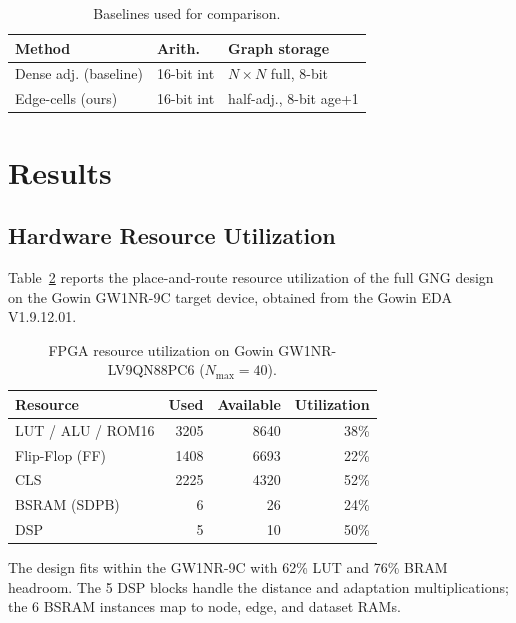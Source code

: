 \documentclass[conference]{IEEEtran}
\begin{document}
\begin{table}[!h]
\caption{Baselines used for comparison.}
\label{tab:baselines}
\centering
\footnotesize
\begin{tabular}{l l l}
\toprule
\textbf{Method} & \textbf{Arith.} & \textbf{Graph storage} \\
\midrule
Dense adj. (baseline) & 16-bit int & $N{\times}N$ full, 8-bit \\
Edge-cells (ours)     & 16-bit int & half-adj., 8-bit age+1 \\
\bottomrule
\end{tabular}
\end{table}


\section{Results}

\subsection{Hardware Resource Utilization}
Table~\ref{tab:synthesis} reports the place-and-route resource utilization of the full GNG design on the Gowin GW1NR-9C target device, obtained from the Gowin EDA V1.9.12.01.

\begin{table}[!h]
\centering
\caption{FPGA resource utilization on Gowin GW1NR-LV9QN88PC6 ($N_{\max}=40$).}
\label{tab:synthesis}
\footnotesize
\begin{tabular}{l r r r}
\toprule
\textbf{Resource} & \textbf{Used} & \textbf{Available} & \textbf{Utilization} \\
\midrule
LUT / ALU / ROM16 & 3205 & 8640  & 38\% \\
Flip-Flop (FF)    & 1408 & 6693  & 22\% \\
CLS               & 2225 & 4320  & 52\% \\
BSRAM (SDPB)      &    6 &   26  & 24\% \\
DSP               &    5 &   10  & 50\% \\
\bottomrule
\end{tabular}
\end{table}

The design fits within the GW1NR-9C with 62\% LUT and 76\% BRAM headroom. The 5 DSP blocks handle the distance and adaptation multiplications; the 6 BSRAM instances map to node, edge, and dataset RAMs.
\end{document}
